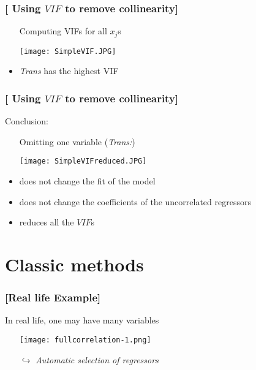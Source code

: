 \documentclass[xcolor=x11names,compress]{beamer}
\renewcommand{\(}{\begin{columns}}
\renewcommand{\)}{\end{columns}}
\newcommand{\<}[1]{\begin{column}{#1}}
\renewcommand{\>}{\end{column}}
\begin{document}
\begin{frame} %
\frametitle{\textcolor{brique}{[ Using $VIF$ to remove collinearity]}}
\pause
\begin{itemize}[<+->]
  \item[]Computing VIFs for all $x_j$s
  \item[] \texttt{[image: SimpleVIF.JPG]} \\
\item  \emph{Trans} has the highest VIF
\end{itemize}
\end{frame}


\begin{frame} %
\frametitle{\textcolor{brique}{[ Using $VIF$ to remove collinearity]}}
Conclusion:
\pause
\begin{itemize}[<+->]
  \item[] Omitting one variable (\textit{Trans:})
  \item[] \texttt{[image: SimpleVIFreduced.JPG]} \\
 \item  does not change the fit of the model
 \item  does not change the coefficients of the uncorrelated regressors
 \item reduces all the $VIF$s
\end{itemize}
\end{frame}



\section{Classic methods}

\begin{frame} %
\frametitle{\textcolor{brique}{[Real life Example]}}
In real life, one may have many variables
\pause
\begin{itemize}[<+->]
  \item[] \texttt{[image: fullcorrelation-1.png]}
  \item[$\hookrightarrow$] \textit{Automatic selection of regressors }
\end{itemize}
\end{frame}
\end{document}
